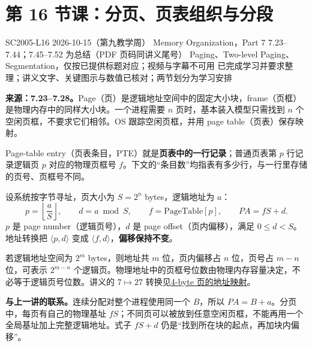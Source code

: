 
\begingroup
\renewcommand{\recordid}[1]{}
\renewcommand{\relatedexercise}[2]{\hyperref[exercise:#1]{#2}}
\section{第 16 节课：分页、页表组织与分段}
\label{lecture:SC2005-L16}

\lecturemeta
  {SC2005-L16}
  {2026-10-15（第九教学周）}
  {Memory Organization，Part 7}
  {7.23--7.44；7.45--7.52 为总结（PDF 页码同讲义尾号）}
  {Paging、Two-level Paging、Segmentation，仅按已提供标题对应；视频与字幕不可用}
  {已完成学习并要求整理；讲义文字、关键图示与数值已核对；两节划分为学习安排}



\textbf{来源：7.23--7.28。}Page（页）是逻辑地址空间中的固定大小块，frame（页框）是物理内存中的同样大小块。一个进程需要 $n$ 页时，基本装入模型只需找到 $n$ 个空闲页框，不要求它们相邻。OS 跟踪空闲页框，并用 page table（页表）保存映射。

Page-table entry（页表条目，PTE）就是\textbf{页表中的一行记录}；普通页表第 $p$ 行记录逻辑页 $p$ 对应的物理页框号 $f$。下文的“条目数”均指表有多少行，与一行里存储的页号、页框号不同。

设系统按字节寻址，页大小为 $S=2^n$ bytes，逻辑地址为 $a$：
\[
 p=\left\lfloor\frac{a}{S}\right\rfloor,\qquad
 d=a\bmod S,\qquad f=\mathrm{PageTable}[p],\qquad
 \boxed{PA=fS+d}.
\]
$p$ 是 page number（逻辑页号），$d$ 是 page offset（页内偏移），满足 $0\le d<S$。地址转换把 $\langle p,d\rangle$ 变成 $\langle f,d\rangle$，\textbf{偏移保持不变}。

若逻辑地址空间为 $2^m$ bytes，则地址共 $m$ 位，页内偏移占 $n$ 位，页号占 $m-n$ 位，可表示 $2^{m-n}$ 个逻辑页。物理地址中的页框号位数由物理内存容量决定，不必等于逻辑页号位数。讲义的 $7\mapsto27$ 转换见\relatedexercise{SC2005-L16-E01}{4-byte 页的地址映射}。

\textbf{与上一讲的联系。}连续分配对整个进程使用同一个 $B$，所以 $PA=B+a$。分页中，每页有自己的物理基址 $fS$；不同页可以被放到任意空闲页框，不能再用一个全局基址加上完整逻辑地址。式子 $fS+d$ 仍是“找到所在块的起点，再加块内偏移”。

